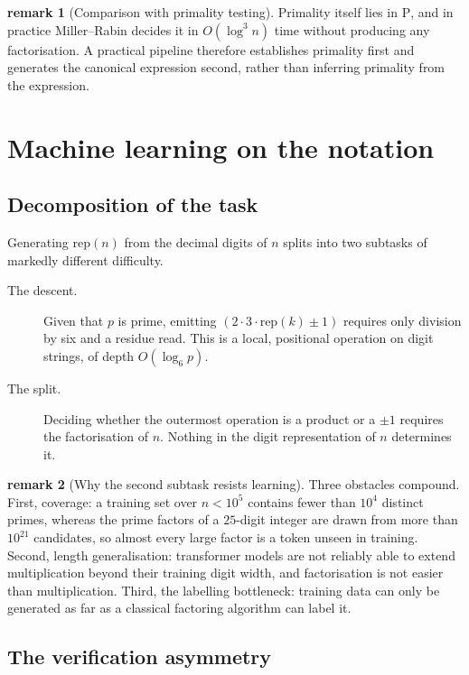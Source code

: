 \documentclass[11pt]{article}
\theoremstyle{definition}
\newtheorem{remark}{remark}
\begin{document}
\begin{remark}[Comparison with primality testing]
Primality itself lies in $\mathrm{P}$, and in practice Miller--Rabin decides it
in $O(\log^3 n)$ time without producing any factorisation. A practical
pipeline therefore establishes primality first and generates the canonical
expression second, rather than inferring primality from the expression.
\end{remark}

\section{Machine learning on the notation}

\subsection{Decomposition of the task}

Generating $\mathrm{rep}(n)$ from the decimal digits of $n$ splits into two
subtasks of markedly different difficulty.

\begin{description}
  \item[The descent.] Given that $p$ is prime, emitting
        $(2\cdot3\cdot\mathrm{rep}(k)\pm1)$ requires only division by six and a
        residue read. This is a local, positional operation on digit strings,
        of depth $O(\log_6 p)$.
  \item[The split.] Deciding whether the outermost operation is a product or a
        $\pm1$ requires the factorisation of $n$. Nothing in the digit
        representation of $n$ determines it.
\end{description}

\begin{remark}[Why the second subtask resists learning]
Three obstacles compound. First, coverage: a training set over $n<10^{5}$
contains fewer than $10^{4}$ distinct primes, whereas the prime factors of a
$25$-digit integer are drawn from more than $10^{21}$ candidates, so almost
every large factor is a token unseen in training. Second, length
generalisation: transformer models are not reliably able to extend
multiplication beyond their training digit width, and factorisation is not
easier than multiplication. Third, the labelling bottleneck: training data can
only be generated as far as a classical factoring algorithm can label it.
\end{remark}

\subsection{The verification asymmetry}
\end{document}
